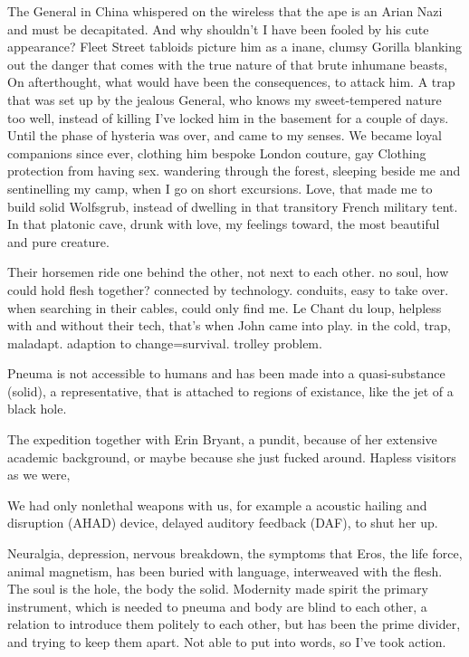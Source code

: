 \documentclass{article}
\begin{document}
The General in China whispered on the wireless
that the ape is an Arian Nazi and must be decapitated.
And why shouldn't I have been fooled by his cute appearance?
Fleet Street tabloids picture him as a inane, clumsy Gorilla
blanking out the danger that comes with the true nature of that brute inhumane beasts,
On afterthought, what would have been the consequences, to attack him. 
A trap that was set up by the jealous General, 
who knows my sweet-tempered nature too well, instead of killing I've locked him in the basement for a couple of days. 
Until the phase of hysteria was over, and came to my senses.
We became loyal companions since ever, clothing him bespoke London couture, 
gay Clothing protection from having sex. 
wandering through the forest, sleeping beside me and sentinelling my camp, when I go on short excursions.
Love, that made me to build solid Wolfsgrub, instead of dwelling in that transitory French military tent.
In that platonic cave, drunk with love, 
my feelings toward, the most beautiful and pure creature.
 

Their horsemen ride one behind the other, not next to each other.
no soul, how could hold flesh together?
connected by technology. 
conduits, easy to take over. 
when searching in their cables, could only find me.
Le Chant du loup, helpless with and without their tech,  
that's when John came into play. 
in the cold, trap, maladapt.
adaption to change=survival. 
trolley problem.

Pneuma is not accessible to humans and has been made into a quasi-substance (solid), a representative, 
that is attached to regions of existance, like the jet of a black hole. 

The expedition together with Erin Bryant, a pundit,
because of her extensive academic background, 
or maybe because she just fucked around. 
Hapless visitors as we were, 


We had only nonlethal weapons with us,
for example a acoustic hailing and disruption (AHAD) device,
delayed auditory feedback (DAF),
to shut her up.

Neuralgia, depression, nervous breakdown, the symptoms that Eros, the life force, 
animal magnetism, has been buried with language, interweaved with the flesh.
The soul is the hole, the body the solid. 
Modernity made spirit the primary instrument, which is needed to pneuma and body are blind to each other, a relation to introduce them politely to each other, but has been the prime divider, and trying to keep them apart. 
Not able to put into words, so I've took action. 
\end{document}
